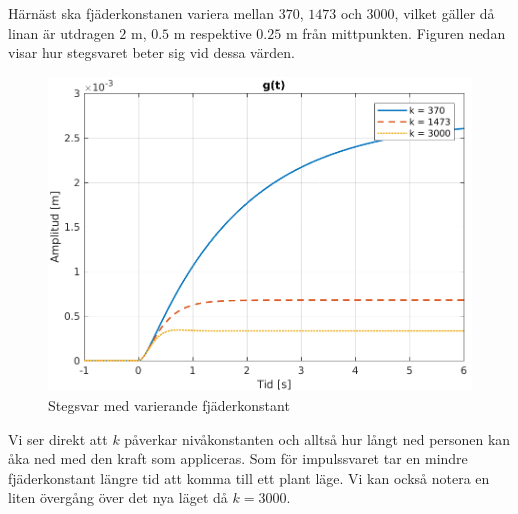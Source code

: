 \newpage
Härnäst ska fjäderkonstanen variera mellan $370$, $1473$ och $3000$, vilket gäller då linan är utdragen $2$ m, $0.5$ m respektive $0.25$ m från mittpunkten. Figuren nedan visar hur stegsvaret beter sig vid dessa värden.
\begin{figure}[H]
    \centering
    \includegraphics[scale=0.9]{bilder/stegsvar_variation_k}
    \caption{Stegsvar med varierande fjäderkonstant}
    \label{fig:stegsvar_variation_k}
\end{figure}
Vi ser direkt att $k$ påverkar nivåkonstanten och alltså hur långt ned personen kan åka ned med den kraft som appliceras. Som för impulssvaret tar en mindre fjäderkonstant längre tid att komma till ett plant läge. Vi kan också notera en liten övergång över det nya läget då $k=3000$.

